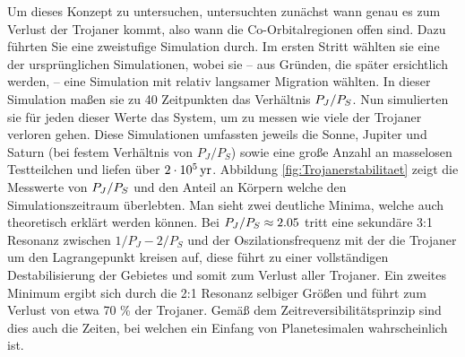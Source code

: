 \documentclass[12pt,a4paper,twoside]{article}
\renewcommand{\cite}{\citep}
\begin{document}
Um dieses Konzept zu untersuchen, untersuchten \cite{Morbidelli2005} zunächst wann genau es zum Verlust der Trojaner kommt, also wann die Co-Orbitalregionen offen sind. %
Dazu führten Sie eine zweistufige Simulation durch. Im ersten Stritt wählten sie eine der ursprünglichen Simulationen, wobei sie – aus Gründen, die später ersichtlich werden, – eine Simulation mit relativ langsamer Migration wählten. %
In dieser Simulation maßen sie zu 40 Zeitpunkten das Verhältnis $P_J/P_S$.
Nun simulierten sie für jeden dieser Werte das System, um zu messen wie viele der Trojaner verloren gehen. Diese Simulationen umfassten jeweils die Sonne, Jupiter und Saturn (bei festem Verhältnis von $P_J/P_S$) sowie eine große Anzahl an masselosen Testteilchen und liefen über $\unit[2\cdot10^5]{yr}$.
Abbildung \ref{fig:Trojanerstabilitaet} zeigt die Messwerte von $P_J/P_S$ und den Anteil an Körpern welche den Simulationszeitraum überlebten. Man sieht zwei deutliche Minima, welche auch theoretisch erklärt werden können.
Bei $P_J/P_S \approx 2.05$ tritt eine sekundäre 3:1 Resonanz zwischen $1/P_J-2/P_S$ und der Oszilationsfrequenz mit der die Trojaner um den Lagrangepunkt kreisen auf, diese führt zu einer vollständigen Destabilisierung der Gebietes und somit zum Verlust aller Trojaner.
Ein zweites Minimum ergibt sich durch die 2:1 Resonanz selbiger Größen und führt zum Verlust von etwa 70 \% der Trojaner.
Gemäß dem Zeitreversibilitätsprinzip sind dies auch die Zeiten, bei welchen ein Einfang von Planetesimalen wahrscheinlich ist.
\end{document}
